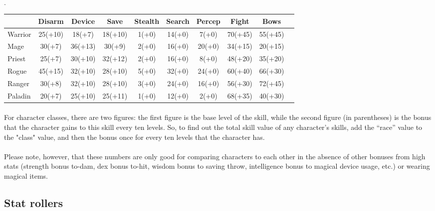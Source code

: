 \paragraph{}.\\
\begin{tabular}{|l|c|c|c|c|c|c|c|c|c|}
\hline
    & Disarm & Device & Save & Stealth & Search & Percep & Fight &
    Bows\\
\hline
Warrior&25(+10) & 18(+7)  & 18(+10) & 1(+0) & 14(+0) & 7(+0)  & 70(+45) & 55(+45)\\
Mage   &30(+7)  & 36(+13) & 30(+9)  & 2(+0) & 16(+0) & 20(+0) & 34(+15) & 20(+15)\\
Priest &25(+7)  & 30(+10) & 32(+12) & 2(+0) & 16(+0) & 8(+0)  & 48(+20)
& 35(+20)\\
Rogue  &45(+15) & 32(+10) & 28(+10) & 5(+0) & 32(+0) & 24(+0) & 60(+40)
& 66(+30)\\
Ranger &30(+8)  & 32(+10) & 28(+10) & 3(+0) & 24(+0) & 16(+0) & 56(+30)
& 72(+45)\\
Paladin&20(+7)  & 25(+10) & 25(+11) & 1(+0) & 12(+0) & 2(+0)  & 68(+35)
& 40(+30)\\
\hline
\end{tabular}

\paragraph{}For character classes, there are two figures: the first figure is the
base level of the skill, while the second figure (in parentheses) is
the bonus that the character gains to this skill every ten levels. So,
to find out the total skill value of any character's skills, add the
``race'' value to the "class" value, and then the bonus once for every ten
levels that the character has.

\paragraph{}Please note, however, that these numbers are only good for comparing
characters to each other in the absence of other bonuses from high stats
(strength bonus to-dam, dex bonus to-hit, wisdom bonus to saving throw,
intelligence bonus to magical device usage, etc.) or wearing magical
items.


\subsection{Stat rollers}
